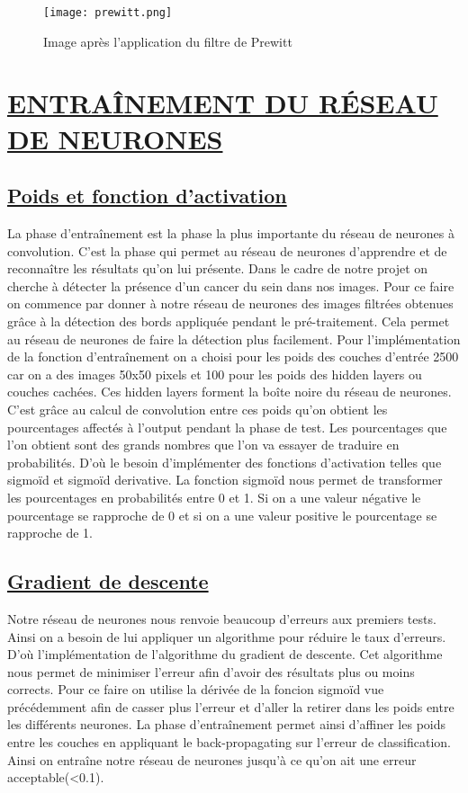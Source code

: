 \documentclass[11pt]{article}
\begin{document}
\begin{figure}[h]
\centering
\texttt{[image: prewitt.png]}
\caption{ Image après l'application du filtre de Prewitt}

\end{figure} 

\section{\underline{ENTRAÎNEMENT DU RÉSEAU DE NEURONES}}
\subsection{\underline{Poids et fonction d'activation}}

La phase d'entraînement est la phase la plus importante du réseau de neurones à convolution. C'est la phase qui permet au réseau de neurones d'apprendre et de reconnaître les résultats qu'on lui présente. Dans le cadre de notre projet on cherche à détecter la présence d'un cancer du sein dans nos images. Pour ce faire on commence par donner à notre réseau de neurones des images filtrées obtenues grâce à la détection des bords appliquée pendant le pré-traitement. Cela permet au réseau de neurones de faire la détection plus facilement. Pour l'implémentation de la fonction d'entraînement on a choisi pour les poids des couches d'entrée 2500 car on a des images 50x50 pixels et 100 pour les poids des hidden layers ou couches cachées. Ces hidden layers forment la boîte noire du réseau de neurones. C'est grâce au calcul de convolution entre ces poids qu'on obtient les pourcentages affectés à l'output pendant la phase de test. Les pourcentages que l'on obtient sont des grands nombres que l'on va essayer de traduire en probabilités. D'où le besoin d'implémenter des fonctions d'activation telles que sigmoïd et sigmoïd derivative. La fonction sigmoïd nous permet de transformer les pourcentages en probabilités entre 0 et 1. Si on a une valeur négative le pourcentage se rapproche de 0 et si on a une valeur positive le pourcentage se rapproche de 1.
\subsection{\underline{Gradient de descente}}

Notre réseau de neurones nous renvoie beaucoup d'erreurs aux premiers tests. Ainsi on a besoin de lui appliquer un algorithme pour réduire le taux d'erreurs. D'où l'implémentation de l'algorithme du gradient de descente. Cet algorithme nous permet de minimiser l'erreur afin d'avoir des résultats plus ou moins corrects. Pour ce faire on utilise la dérivée de la foncion sigmoïd vue précédemment afin de casser plus l'erreur et d'aller la retirer dans les poids entre les différents neurones. La phase d'entraînement permet ainsi d'affiner les poids entre les couches en appliquant le back-propagating sur l'erreur de classification. Ainsi on entraîne notre réseau de neurones jusqu'à ce qu'on ait une erreur acceptable(<0.1). 
\end{document}
